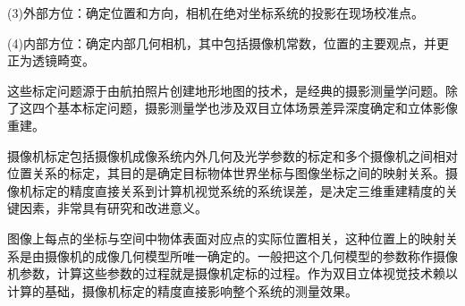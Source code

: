(3)外部方位：确定位置和方向，相机在绝对坐标系统的投影在现场校准点。

(4)内部方位：确定内部几何相机，其中包括摄像机常数，位置的主要观点，并更正为透镜畸变。

这些标定问题源于由航拍照片创建地形地图的技术，是经典的摄影测量学问题。除了这四个基本标定问题，摄影测量学也涉及双目立体场景差异深度确定和立体影像重建。

摄像机标定包括摄像机成像系统内外几何及光学参数的标定和多个摄像机之间相对位置关系的标定，其目的是确定目标物体世界坐标与图像坐标之间的映射关系。摄像机标定的精度直接关系到计算机视觉系统的系统误差，是决定三维重建精度的关键因素，非常具有研究和改进意义。

图像上每点的坐标与空间中物体表面对应点的实际位置相关，这种位置上的映射关系是由摄像机的成像几何模型所唯一确定的。一般把这个几何模型的参数称作摄像机参数，计算这些参数的过程就是摄像机定标的过程。作为双目立体视觉技术赖以计算的基础，摄像机标定的精度直接影响整个系统的测量效果。



